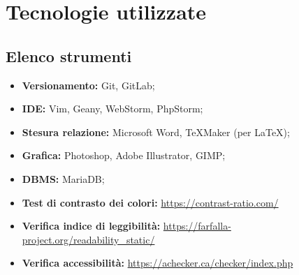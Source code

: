 \section{Tecnologie utilizzate}
	\subsection{Elenco strumenti}
	\begin{itemize}
		\item \textbf{Versionamento:} Git, GitLab;
		\item \textbf{IDE:} Vim, Geany, WebStorm, PhpStorm;
		\item \textbf{Stesura relazione:} Microsoft Word, TeXMaker (per \LaTeX );
		\item \textbf{Grafica:} Photoshop, Adobe Illustrator, GIMP;
		\item \textbf{DBMS:} MariaDB;
		\item \textbf{Test di contrasto dei colori:} \url{https://contrast-ratio.com/}
		\item \textbf{Verifica indice di leggibilità:} \url{https://farfalla-project.org/readability\_static/}
		\item \textbf{Verifica accessibilità:} \url{https://achecker.ca/checker/index.php}
	\end{itemize}

